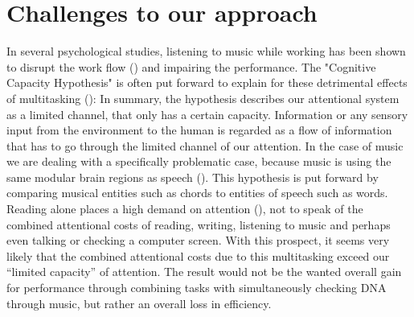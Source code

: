 \documentclass[10pt]{article}
\begin{document}
\section{Challenges to our approach}
In several psychological studies, listening to music while working has been shown to disrupt the work flow (\cite{fast_loud}) and impairing the performance. The "Cognitive Capacity Hypothesis" is often put forward to explain for these detrimental effects of multitasking (\cite{baddley_2003}): In summary, the hypothesis describes our attentional system as a limited channel, that only has a certain capacity. Information or any sensory input from the environment to the human is regarded as a flow of information that has to go through the limited channel of our attention. In the case of music we are dealing with a specifically problematic case, because music is using the same modular brain regions as speech (\cite{peretez_colthearth_2003}). This hypothesis is put forward by comparing musical entities such as chords to entities of speech such as words. Reading alone places a high demand on attention (\cite{Carretti_Borella_Cornoldi_De_Beni_2009}), not to speak of the combined attentional costs of reading, writing, listening to music and perhaps even talking or checking a computer screen. With this prospect, it seems very likely that the combined attentional costs due to this multitasking exceed our “limited capacity” of attention. The result would not be the wanted overall gain for performance through combining tasks with simultaneously checking DNA through music, but rather an overall loss in efficiency.
\end{document}
